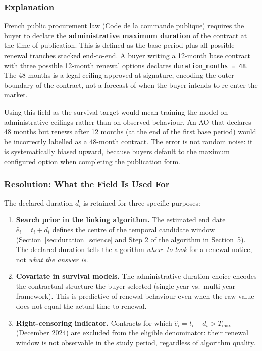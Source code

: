 \documentclass[12pt, a4paper]{article}
\begin{document}
\subsubsection*{Explanation}

French public procurement law (Code de la commande publique) requires the buyer
to declare the \textbf{administrative maximum duration} of the contract at the
time of publication. This is defined as the base period plus all possible
renewal tranches stacked end-to-end. A buyer writing a 12-month base contract
with three possible 12-month renewal options declares
\texttt{duration\_months = 48}. The 48 months is a legal ceiling approved at
signature, encoding the outer boundary of the contract, not a forecast of when
the buyer intends to re-enter the market.

Using this field as the survival target would mean training the model on
administrative ceilings rather than on observed behaviour. An AO that declares
48 months but renews after 12 months (at the end of the first base period)
would be incorrectly labelled as a 48-month contract. The error is not random
noise: it is systematically biased upward, because buyers default to the
maximum configured option when completing the publication form.

\subsubsection*{Resolution: What the Field Is Used For}

The declared duration $d_i$ is retained for three specific purposes:

\begin{enumerate}
  \item \textbf{Search prior in the linking algorithm.} The estimated end date
        $\hat{e}_i = t_i + d_i$ defines the centre of the temporal candidate
        window (Section~\ref{sec:duration_science} and Step 2 of the algorithm
        in Section~5). The declared duration tells the algorithm
        \textit{where to look} for a renewal notice, not \textit{what the
        answer is}.

  \item \textbf{Covariate in survival models.} The administrative duration
        choice encodes the contractual structure the buyer selected (single-year
        vs.\ multi-year framework). This is predictive of renewal behaviour
        even when the raw value does not equal the actual time-to-renewal.

  \item \textbf{Right-censoring indicator.} Contracts for which
        $\hat{e}_i = t_i + d_i > T_{\max}$ (December 2024) are excluded from
        the eligible denominator: their renewal window is not observable in the
        study period, regardless of algorithm quality.
\end{enumerate}
\end{document}

